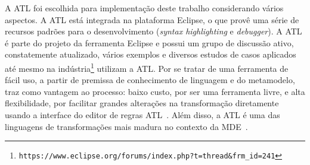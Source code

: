 A ATL foi escolhida para implementação deste trabalho considerando vários aspectos. A ATL está integrada na plataforma Eclipse, o que provê uma série de recursos padrões para o desenvolvimento (\textit{syntax highlighting} e \textit{debugger}). A ATL é parte do projeto  da ferramenta Eclipse e possui um grupo de discussão ativo, constatemente atualizado, vários exemplos e diversos estudos de casos aplicados até mesmo na indústria\footnote{\texttt{\texttt{https://www.eclipse.org/forums/index.php?t=thread&frm_id=241}}} utilizam a ATL. Por se tratar de uma ferramenta de fácil uso, a partir de premissa de conhecimento de linguagem e do metamodelo, traz como vantagem ao processo: baixo custo, por ser uma ferramenta livre, e alta flexibilidade, por facilitar grandes alterações na transformação diretamente usando a interface do editor de regras ATL~\cite{Salem_2008}. Além disso, a ATL é uma das linguagens de transformações mais madura no contexto da MDE~\cite{bruneliere_2010}.



































